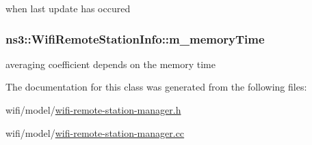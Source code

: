 when last update has occured 

\subsubsection[{\texorpdfstring{m\+\_\+memory\+Time}{m_memoryTime}}]{ ns3\+::\+Wifi\+Remote\+Station\+Info\+::m\+\_\+memory\+Time\hspace{0.3cm}{\ttfamily [private]}}\hypertarget{classns3_1_1WifiRemoteStationInfo_ad830808aec2694999e4a04efd1248395}{}\label{classns3_1_1WifiRemoteStationInfo_ad830808aec2694999e4a04efd1248395}


averaging coefficient depends on the memory time 



The documentation for this class was generated from the following files\+:\begin{DoxyCompactItemize}
\item 
wifi/model/\hyperlink{wifi-remote-station-manager_8h}{wifi-\/remote-\/station-\/manager.\+h}\item 
wifi/model/\hyperlink{wifi-remote-station-manager_8cc}{wifi-\/remote-\/station-\/manager.\+cc}\end{DoxyCompactItemize}
